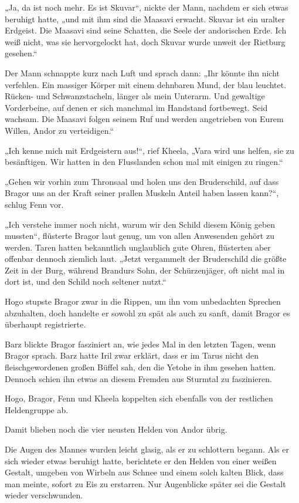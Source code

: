 „Ja, da ist noch mehr. Es ist Skuvar“, nickte der Mann, nachdem er sich etwas beruhigt hatte, „und mit ihm sind die Maasavi erwacht. Skuvar ist ein uralter Erdgeist. Die Maasavi sind seine Schatten, die Seele der andorischen Erde. Ich weiß nicht, was sie hervorgelockt hat, doch Skuvar wurde unweit der Rietburg gesehen.“

Der Mann schnappte kurz nach Luft und sprach dann: „Ihr könnte ihn nicht verfehlen. Ein massiger Körper mit einem dehnbaren Mund, der blau leuchtet. Rücken- und Schwanzstacheln, länger als mein Unterarm. Und gewaltige Vorderbeine, auf denen er sich manchmal im Handstand fortbewegt. Seid wachsam. Die Maasavi folgen seinem Ruf und werden angetrieben von Eurem Willen, Andor zu verteidigen.“

„Ich kenne mich mit Erdgeistern aus!“, rief Kheela, „Vara wird uns helfen, sie zu besänftigen. Wir hatten in den Flusslanden schon mal mit einigen zu ringen.“

„Gehen wir vorhin zum Thronsaal und holen uns den Bruderschild, auf dass Bragor uns an der Kraft seiner prallen Muskeln Anteil haben lassen kann?“, schlug Fenn vor.

„Ich verstehe immer noch nicht, warum wir den Schild diesem König geben mussten“, flüsterte Bragor laut genug, um von allen Anwesenden gehört zu werden. Taren hatten bekanntlich unglaublich gute Ohren, flüsterten aber offenbar dennoch ziemlich laut. „Jetzt vergammelt der Bruderschild die größte Zeit in der Burg, während Brandurs Sohn, der Schürzenjäger, oft nicht mal in dort ist, und den Schild noch seltener nutzt.“

Hogo stupste Bragor zwar in die Rippen, um ihn vom unbedachten Sprechen abzuhalten, doch handelte er sowohl zu spät als auch zu sanft, damit Bragor es überhaupt registrierte.

Barz blickte Bragor fasziniert an, wie jedes Mal in den letzten Tagen, wenn Bragor sprach. Barz hatte Iril zwar erklärt, dass er im Tarus nicht den fleischgewordenen großen Büffel sah, den die Yetohe in ihm gesehen hatten. Dennoch schien ihn etwas an diesem Fremden aus Sturmtal zu faszinieren.

Hogo, Bragor, Fenn und Kheela koppelten sich ebenfalls von der restlichen Heldengruppe ab.

Damit blieben noch die vier neusten Helden von Andor übrig.

Die Augen des Mannes wurden leicht glasig, als er zu schlottern begann. Als er sich wieder etwas beruhigt hatte, berichtete er den Helden von einer weißen Gestalt, umgeben von Wirbeln aus Schnee und einem solch kalten Blick, dass man meinte, sofort zu Eis zu erstarren. Nur Augenblicke später sei die Gestalt wieder verschwunden.

